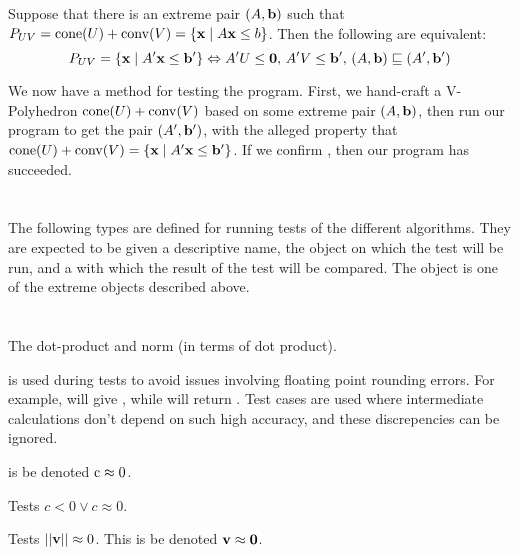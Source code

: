 \begin{EqCriteria}\label{eq_vp_hp}
Suppose that there is an extreme pair $(A,\mathbf{b})$ such that $P_{UV} = \operatorname{cone}(U) + \operatorname{conv}(V) = \left\{\mathbf{x}\;|\; A\mathbf{x}\leq b\right\}$.  Then the following are equivalent:
\[ P_{UV} = \left\{\mathbf{x}\;|\; A'\mathbf{x}\leq \mathbf{b}'\right\} \Leftrightarrow A'U\leq\mathbf{0},\,A'V\leq\mathbf{b}',\,(A,\mathbf{b})\sqsubseteq (A',\mathbf{b}') \]
\end{EqCriteria}

\begin{Test}\label{test_vp_to_hp}
	We now have a method for testing the program.  First, we hand-craft a V-Polyhedron $\operatorname{cone}(U) + \operatorname{conv}(V)$ based on some extreme pair $(A,\mathbf{b})$, then run our program to get the pair $(A',\mathbf{b}')$, with the alleged property that $\operatorname{cone}(U) + \operatorname{conv}(V) = \left\{\mathbf{x}\;|\; A'\mathbf{x}\leq \mathbf{b}'\right\}$.  If we confirm , then our program has succeeded.
\end{Test}

\section{}

The following types are defined for running tests of the different algorithms.  They are expected to be given a descriptive name, the object on which the test will be run, and a  with which the result of the test will be compared.  The  object is one of the extreme objects described above.
\lsthconetestcasea
\lstvconetestcasea
\lsthpolytestcaseb
\lstvpolytestcaseb

\section{}

The dot-product and norm (in terms of dot product).
\lstoperator
\lstnorm

 is used during tests to avoid issues involving floating point rounding errors.  For example,  will give , while  will return .  Test cases are used where intermediate calculations don't depend on such high accuracy, and these discrepencies can be ignored.

 is be denoted $\mli{c} \approx 0$.
\lstapproximatelyzeroa

Tests $c < 0 \lor c \approx 0$.
\lstapproximatelyltzero

Tests $\left|\left|\mathbf{v}\right|\right| \approx 0$.  This is be denoted $\mathbf{v} \approx \mathbf{0}$.
\lstapproximatelyzerob

